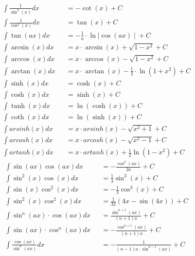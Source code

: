 \begin{small}
\begin{align*}
         & \int \frac{1}{\sin^2(x)}dx     &  & = -\cot(x)+C                                                    \\
         & \int \frac{1}{\cos^2(x)}dx     &  & = \tan(x)+C                                                     \\
         & \int \tan(ax) dx               &  & = -\frac{1}{a} \cdot \ln{\mid \cos(ax) \mid }+C                 \\
         & \int \arcsin (x) dx            &  & = x \cdot \arcsin(x)+\sqrt{1-x^2}+C                             \\
         & \int \arccos (x) dx            &  & = x \cdot \arccos(x)-\sqrt{1-x^2}+C                             \\
         & \int \arctan (x) dx            &  & = x \cdot \arctan(x)-\frac{1}{2} \cdot \ln(1+x^2)+C             \\
         & \int \sinh(x)dx                &  & = \cosh(x)+C                                                    \\
         & \int \cosh(x)dx                &  & = \sinh(x)+C                                                    \\
         & \int \tanh(x)dx                &  & = \ln(\cosh(x)) +C                                              \\
         & \int \coth(x)dx                &  & = \ln(\sinh(x))+C                                               \\
         & \int arsinh(x)dx               &  & = x \cdot arsinh(x) - \sqrt{x^2+1}+C                            \\
         & \int arcosh(x)dx               &  & = x \cdot arcosh(x) - \sqrt{x^2-1}+C                            \\
         & \int artanh(x)dx               &  & = x \cdot artanh(x) +\frac{1}{2}\ln(1-x^2)+C
    \end{align*}
    \begin{align*}
         & \int \sin(ax)\cos(ax) dx           &  & = -\frac{\cos^2(ax)}{2a}+C                  \\
         & \int \sin^2(x)\cos(x)dx            &  & =\frac{1}{3}\sin^3(x)+C                     \\
         & \int \sin(x)\cos^2(x)dx            &  & =-\frac{1}{3}\cos^3(x)+C                    \\
         & \int \sin^2(x)\cos^2(x)dx          &  & =\frac{1}{32}(4x-\sin(4x))+C                \\
         & \int \sin^n(ax)\cdot \cos(ax)dx    &  & =\frac{\sin^{n+1}(ax)}{(n+1)a}+C            \\
         & \int \sin(ax)\cdot \cos^n(ax)dx    &  & =-\frac{\cos^{n+1}(ax)}{(n+1)a}+C           \\
         & \int \frac{\cos(ax)}{\sin^n(ax)}dx &  & = -\frac{1}{(n-1)a \cdot \sin^{n-1}(ax)}+C
    \end{align*}
\end{small}

